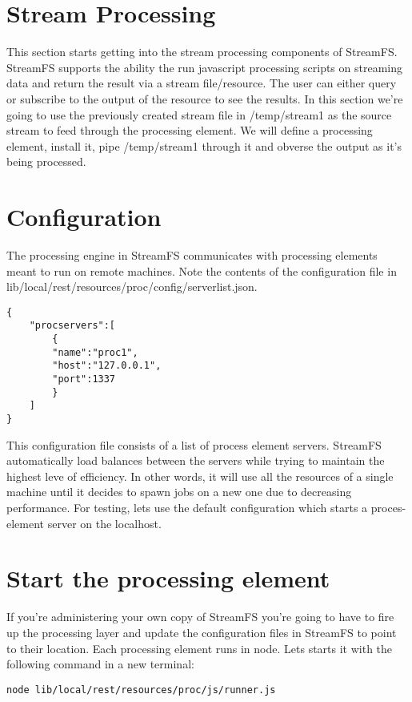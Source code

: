 \section{Stream Processing}
This section starts getting into the stream processing components of StreamFS. StreamFS supports the ability the run javascript processing scripts on streaming data and return the result via a stream file/resource. The user can either query or subscribe to the output of the resource to see the results. In this section we're going to use the previously created stream file in /temp/stream1 as the source stream to feed through the processing element. We will define a processing element, install it, pipe /temp/stream1 through it and obverse the output as it's being processed.

\section{Configuration}

The processing engine in StreamFS communicates with processing elements meant to run on remote machines. Note the contents of the configuration file in lib/local/rest/resources/proc/config/serverlist.json.

\begin{lstlisting}
{
    "procservers":[
        {
        "name":"proc1",
        "host":"127.0.0.1",
        "port":1337
        }
    ]
}
\end{lstlisting}
This configuration file consists of a list of process element servers. StreamFS automatically load balances between the servers while trying to maintain the highest leve of efficiency. In other words, it will use all the resources of a single machine until it decides to spawn jobs on a new one due to decreasing performance. For testing, lets use the default configuration which starts a proces-element server on the localhost.

\section{Start the processing element}

If you're administering your own copy of StreamFS you're going to have to fire up the processing layer and update the configuration files in StreamFS to point to their location. Each processing element runs in node. Lets starts it with the following command in a new terminal:

\begin{lstlisting}
node lib/local/rest/resources/proc/js/runner.js
\end{lstlisting}


